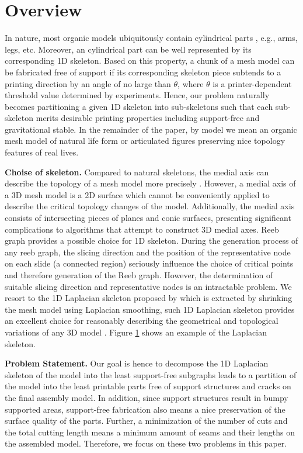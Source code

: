 \section{Overview}

In nature, most organic models ubiquitously contain cylindrical parts \cite{Zhou:2015:GCD}, e.g., arms, legs, etc. Moreover, an cylindrical part can be well represented by its corresponding 1D skeleton. Based on this property, a chunk of a mesh model can be fabricated free of support if its corresponding skeleton piece subtends to a printing direction by an angle of no large than $\theta$, where $\theta$ is a printer-dependent threshold value determined by experiments. Hence, our problem naturally becomes partitioning a given 1{D} skeleton into sub-skeletons such that each sub-skeleton merits desirable printing properties including support-free and gravitational stable. In the remainder of the paper, by model we mean an organic mesh model of natural life form or articulated figures preserving nice topology features of real lives.

\textbf{Choise of skeleton.} Compared to natural skeletons, the medial axis can describe the topology of a mesh model more precisely \cite{ZhangXWYTW15}. However, a medial axis of a 3D mesh model is a 2D surface which cannot be conveniently applied to describe the critical topology changes of the model. Additionally, the medial axis consists of intersecting pieces of planes and conic surfaces, presenting significant complications to algorithms that attempt to construct 3D medial axes.
Reeb graph provides a possible choice for 1D skeleton. During the generation process of any reeb graph, the slicing direction and the position of the representative node on each slide (a connected region) seriously influence the choice of critical points and therefore generation of the Reeb graph. However, the determination of suitable slicing direction and representative nodes is an intractable problem. We resort to the 1D Laplacian skeleton proposed by \cite{AuTCCL08} which is extracted by shrinking the mesh model using Laplacian smoothing, such 1D Laplacian skeleton provides an excellent choice for reasonably describing the geometrical and topological variations of any 3{D} model \cite{AuTCCL08}. Figure \ref{} shows an example of the Laplacian skeleton.

\textbf{Problem Statement.} Our goal is hence to decompose the 1D Laplacian skeleton of the model into the least support-free subgraphs leads to a partition of the model into the least printable parts free of support structures and cracks on the final assembly model. In addition, since support structures result in bumpy supported areas, support-free fabrication also means a nice preservation of the surface quality of the parts. Further, a minimization of the number of cuts and the total cutting length means a minimum amount of seams and their lengths on the assembled model. Therefore, we focus on these two problems in this paper.

